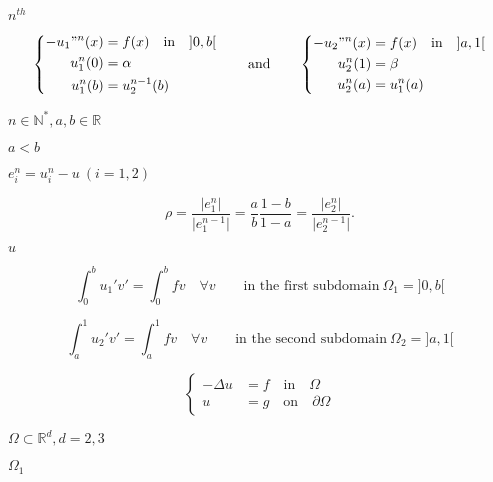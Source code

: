 \documentclass{article}
\begin{document}
$n^{th}$
\pagebreak

\begin{equation} \label{eq:31} \left \{ \begin{aligned} -u_1"^n(x) & = f(x) \quad \text{in} \quad ]0,b[ \\ u_1^n(0) & = \alpha \\ u_1^n(b) & = u_2^{n-1}(b) \end{aligned} \right. \qquad \text{and} \qquad \left \{ \begin{aligned} -u_2"^n(x) & = f(x) \quad \text{in} \quad ]a,1[ \\ u_2^n(1) & = \beta \\ u_2^n(a) & = u_1^n(a) \end{aligned} \right. \end{equation}
\pagebreak

$ n \in \mathbb N^*, a, b \in \mathbb R $
\pagebreak

$a < b$
\pagebreak

$e_i^n = u_i^n-u~(i=1,2)$
\pagebreak

\begin{equation} \rho = \frac{\vert e_1^n \vert}{\vert e_1^{n-1} \vert} = \frac{a}{b}\frac{1-b}{1-a} = \frac{\vert e_2^n \vert}{\vert e_2^{n-1} \vert} . \label{eq:32} \end{equation}
\pagebreak

$u$
\pagebreak

\begin{equation*} \int_0^b u_1'v' = \int_0^b fv \quad \forall v \qquad \text{in the first subdomain} ~\Omega_1 = ]0,b[ \end{equation*}
\pagebreak

\begin{equation*} \int_a^1 u_2'v' = \int_a^1 fv \quad \forall v \qquad \text{in the second subdomain} ~ \Omega_2 = ]a,1[ \end{equation*}
\pagebreak

\begin{equation} \left \{ \begin{aligned} -\Delta u & = f \quad \text{in} \quad \Omega \\ u & = g \quad \text{on} \quad \partial\Omega \end{aligned} \right. \label{eq:33} \end{equation}
\pagebreak

$\Omega \subset \mathbb R^d, d=2,3$
\pagebreak

$\Omega_1$
\pagebreak
\end{document}
